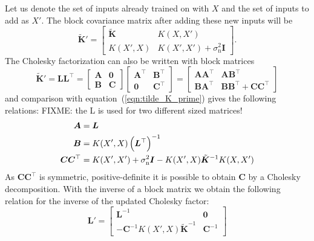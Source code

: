 \documentclass[11pt,a4paper,twoside,BCOR=15mm]{scrreprt}
\newcommand{\mat}[1]{\bm{#1}}
\newcommand{\Tr}{^{\top}}
\newcommand{\ped}[1]{_{\mathrm{#1}}}
\begin{document}
Let us denote the set of inputs already trained on with $X$ and the set of 
inputs to add as $X'$. The block covariance matrix after adding these new inputs 
will be
\begin{equation} \label{eqn:tilde_K_prime}
    \tilde{\mat K}' = \left[ \begin{array}{cc}
            \tilde{\mat K} & K(X, X') \\ K(X', X) & K(X', X') 
            + \sigma\ped{n}^2\mat I
        \end{array}
    \right]\text{.}
\end{equation}
The Cholesky factorization can also be written with block matrices
\begin{equation}
    \tilde{\mat K}' = \mat L \mat L\Tr = \left[
        \begin{array}{cc}
            \mat A & \mat 0 \\ \mat B & \mat C
        \end{array}
    \right] \left[
        \begin{array}{cc}
            \mat A\Tr & \mat B\Tr \\ \mat 0 & \mat C\Tr
        \end{array}
    \right] = \left[
        \begin{array}{cc}
            \mat A \mat A\Tr & \mat A \mat B\Tr \\ \mat B \mat A\Tr & \mat B \mat 
            B\Tr + \mat C \mat C\Tr
        \end{array}
    \right]
\end{equation}
and comparison with equation~(\ref{eqn:tilde_K_prime}) gives the following 
relations:
FIXME\@: the L is used for two different sized matrices!
\begin{align}
    \mat A &= \mat L \\
    \mat B &= K(X', X) \del{\mat L\Tr}^{-1} \\
    \mat C \mat C\Tr &= K(X', X') + \sigma\ped{n}^2\mat I - K(X', 
    X)\tilde{\mat{K}}^{-1}K(X, X')
\end{align}
As $\mat C \mat C\Tr$ is symmetric, positive-definite it is possible to obtain 
$\mat C$ by a Cholesky decomposition.
With the inverse of a block matrix \parencite[45]{Petersen:2008wc} we obtain the 
following relation for the inverse of the updated Cholesky factor:
\begin{equation}
    \mat L' = \left[
        \begin{array}{cc}
            \mat L^{-1} & \mat 0 \\ -\mat C^{-1} K(X', X)\tilde{\mat K}^{-1} 
            & \mat C^{-1}
        \end{array}
    \right]
\end{equation}
\end{document}
